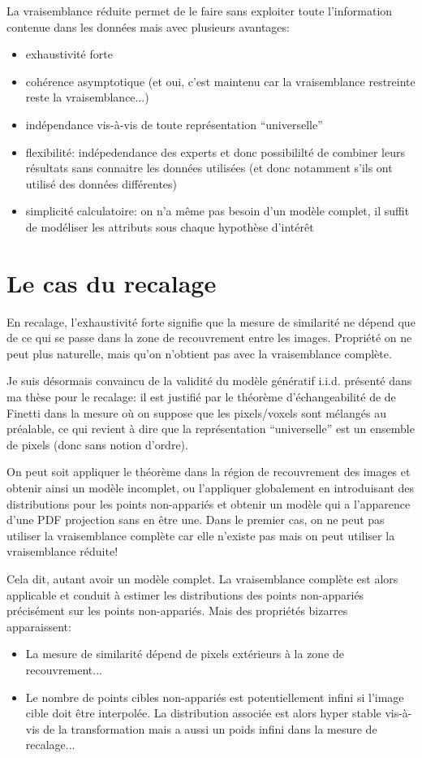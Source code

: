 \documentclass{article}
\begin{document}
La vraisemblance r\'eduite permet de le faire sans exploiter toute l'information contenue dans les donn\'ees mais avec plusieurs avantages: 
\begin{itemize}
\item exhaustivit\'e forte 
\item coh\'erence asymptotique (et oui, c'est maintenu car la vraisemblance   restreinte reste la vraisemblance...) 
\item ind\'ependance vis-\`a-vis de toute repr\'esentation ``universelle'' 
\item flexibilit\'e: ind\'epedendance des experts et donc possibililt\'e de   combiner leurs r\'esultats sans connaitre les donn\'ees utilis\'ees (et   donc notamment s'ils ont utilis\'e des donn\'ees diff\'erentes) 
\item simplicit\'e calculatoire: on n'a m\^eme pas besoin d'un mod\`ele complet,   il suffit de mod\'eliser les attributs sous chaque hypoth\`ese d'int\'er\^et 
\end{itemize}


\section{Le cas du recalage}

En recalage, l'exhaustivit\'e forte signifie que la mesure de similarit\'e ne d\'epend que de ce qui se passe dans la zone de recouvrement entre les images. Propri\'et\'e on ne peut plus naturelle, mais qu'on n'obtient pas avec la vraisemblance compl\`ete. 

Je suis d\'esormais convaincu de la validit\'e du mod\`ele g\'en\'eratif i.i.d. pr\'esent\'e dans ma th\`ese pour le recalage: il est justifi\'e par le th\'eor\`eme d'\'echangeabilit\'e de de Finetti dans la mesure o\`u on suppose que les pixels/voxels sont m\'elang\'es au pr\'ealable, ce qui revient \`a dire que la repr\'esentation ``universelle'' est un ensemble de pixels (donc sans notion d'ordre). 

On peut soit appliquer le th\'eor\`eme dans la r\'egion de recouvrement des images et obtenir ainsi un mod\`ele incomplet, ou l'appliquer globalement en introduisant des distributions pour les points non-appari\'es et obtenir un mod\`ele qui a l'apparence d'une PDF projection sans en \^etre une. Dans le premier cas, on ne peut pas utiliser la vraisemblance compl\`ete car elle n'existe pas mais on peut utiliser la vraisemblance r\'eduite! 

Cela dit, autant avoir un mod\`ele complet. La vraisemblance compl\`ete est alors applicable et conduit \`a estimer les distributions des points non-appari\'es pr\'ecis\'ement sur les points non-appari\'es. Mais des propri\'et\'es bizarres apparaissent: 
\begin{itemize}
\item La mesure de similarit\'e d\'epend de pixels ext\'erieurs \`a la zone de   recouvrement... 
\item Le nombre de points cibles non-appari\'es est potentiellement infini si l'image cible doit \^etre interpol\'ee. La distribution associ\'ee est alors hyper stable vis-\`a-vis de la transformation mais a aussi un poids infini dans la mesure de recalage... 
\end{itemize}
\end{document}
